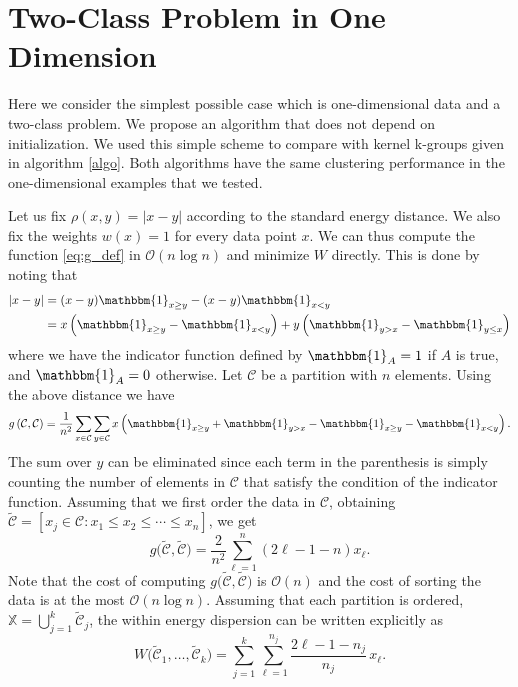 \documentclass[10pt,journal,compsoc]{IEEEtran}
\newcommand\C{{\mathcal{C}}}
\newcommand\tC{{\widetilde{\C}}}
\newcommand\OO{{\mathcal{O}}}
\newcommand{\Ind}[1]{\mathbbm{1}_{#1}}
\begin{document}
\section*{Two-Class Problem in One Dimension}
\label{sec:twoclass}

Here we consider the simplest possible case which
is one-dimensional data and a two-class problem. We propose
an algorithm that does not depend on initialization. We used this simple
scheme to compare with kernel k-groups given
in algorithm \ref{algo}. Both algorithms have the same clustering
performance in the one-dimensional examples that we tested.

Let us fix 
$\rho(x,y) = |x - y|$ according to the standard energy distance. We also
fix the weights $w(x) = 1$ for every data point $x$. We can
thus 
compute the function
\eqref{eq:g_def} in $\OO(n \log n)$ and minimize
$W$ directly.
This is done by noting that
\begin{equation}
\begin{aligned}
|x - y|  &= (x-y)\Ind{x \ge y} -
(x-y) \Ind{x < y}  \\
&= 
x \left( \Ind{x \ge y} - \Ind{x < y} \right)  + 
y \left( \Ind{y > x} - \Ind{y \le x} \right)  
\end{aligned}
\end{equation}
where we have the indicator function defined by
$\Ind{A}=1$ if $A$ is true, and $\Ind{A}=0$ otherwise.
Let $\C$ be a partition with
$n$ elements. Using the above distance we have
\begin{equation}
\label{eq:g_ind}
 g\left(\C,\C\right) =  \dfrac{1}{n^2}  
\sum_{x \in \C} 
\sum_{y \in \C} 
x \left(
\Ind{x \ge y} + \Ind{y > x} - 
\Ind{x \ge y}-\Ind{x < y} \right) .
\end{equation}
The sum over $y$ can be eliminated since each term in
the parenthesis is simply counting the number of elements in $\C$ that satisfy
the condition of the indicator function. Assuming
that we first order the data in $\C$, obtaining
$\tC = [ x_j \in \C: x_1 \le x_2 \le \dotsm \le x_{n}]$, we
get
\begin{equation}
\label{eq:g1d}
g\big(\tC, \tC \big) = 
\dfrac{2}{n^2} \sum_{\ell=1}^n (2\ell - 1 - n) x_\ell .
\end{equation}
Note that the cost of computing
$g\big( \tC, \tC \big)$
is $\OO(n)$ and the cost of
sorting the data
is at the most $\OO(n\log n)$.
Assuming that each partition is ordered,
$\mathbb{X} = \bigcup_{j=1}^k \tC_j$,
the within energy dispersion
can be written explicitly as
\begin{equation}
\label{eq:w1d}
W\big( \tC_1,\dotsc,\tC_k \big) = 
\sum_{j=1}^k \sum_{\ell=1}^{n_j} \dfrac{2\ell - 1 - n_j}{n_j} \, x_\ell.
\end{equation}
\end{document}

